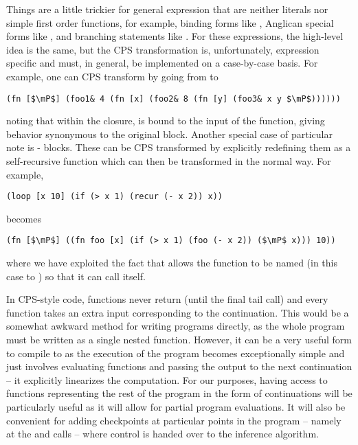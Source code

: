 Things are a little
trickier for general expression that are neither literals nor simple first order functions, for example,
binding forms like , Anglican special forms like \sample, and branching statements like .
For these expressions, the high-level idea is the same, but the CPS transformation is, unfortunately, 
expression specific and must, in general, be implemented on a case-by-case basis.  
For example, one can CPS transform  by going from
 to
 \begin{lstlisting}[basicstyle=\ttfamily\small,frame=none]
 (fn [$\mP$] (foo1& 4 (fn [x] (foo2& 8 (fn [y] (foo3& x y $\mP$))))))
 \end{lstlisting}\vspace{-8pt}
noting that within the  closure,  is bound to the input of the 
function, giving behavior synonymous to the original
 block.  
Another special case of particular note is - blocks.  These can be CPS
transformed by explicitly redefining them as a self-recursive function which can then
be transformed in the normal way.  For example,
\begin{lstlisting}[basicstyle=\ttfamily\small,frame=none]
 (loop [x 10] (if (> x 1) (recur (- x 2)) x))
 \end{lstlisting}\vspace{-8pt}
becomes
\begin{lstlisting}[basicstyle=\ttfamily\small,frame=none]
 (fn [$\mP$] ((fn foo [x] (if (> x 1) (foo (- x 2)) ($\mP$ x))) 10))
 \end{lstlisting}\vspace{-8pt}
where we have exploited the fact that  allows the function to be named (in this case to
) so that it can call itself.
 
In CPS-style code, functions never return (until the final tail call) and every function takes an
extra input corresponding to the continuation.  This would be a somewhat awkward method for
writing programs directly, as the whole program must be written as a single nested function.  However,
it can be a very useful form to compile to as the execution of the program becomes
exceptionally simple and just involves evaluating functions and passing the output to the
next continuation -- it explicitly linearizes the computation.  For our purposes, having access
to functions representing the rest of the program in the form of continuations will be
particularly useful as it will allow for partial program evaluations.  It will also be convenient
for adding checkpoints at particular points in the program -- namely at the \sample and
\observe calls -- where control is handed over to the inference algorithm.

